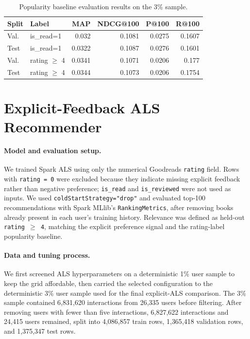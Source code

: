 \documentclass[10pt,twocolumn]{article}
\begin{document}
\begin{table}[!ht]
\centering
\caption{Popularity baseline evaluation results on the 3\% sample.}
\label{tab:popularity}
\footnotesize
\setlength{\tabcolsep}{3pt}
\begin{tabular}{l l r r r r}
\toprule
\textbf{Split} & \textbf{Label} & \textbf{MAP} & \textbf{NDCG@100} & \textbf{P@100} & \textbf{R@100} \\
\midrule
Val.  & is\_read=1     & 0.032 & 0.1081 & 0.0275 & 0.1607 \\
Test  & is\_read=1     & 0.0322 & 0.1087 & 0.0276 & 0.1601 \\
Val.  & rating $\geq$ 4 & 0.0341 & 0.1071 & 0.0206 & 0.177 \\
Test  & rating $\geq$ 4 & 0.0344 & 0.1073 & 0.0206 & 0.1754 \\
\bottomrule
\end{tabular}
\end{table}

\section{Explicit-Feedback ALS Recommender}

\paragraph{Model and evaluation setup.} We trained Spark ALS using only the numerical Goodreads \texttt{rating} field. Rows with \texttt{rating = 0} were excluded because they indicate missing explicit feedback rather than negative preference; \texttt{is\_read} and \texttt{is\_reviewed} were not used as inputs. We used \texttt{coldStartStrategy="drop"} and evaluated top-100 recommendations with Spark MLlib's \texttt{RankingMetrics}, after removing books already present in each user's training history. Relevance was defined as held-out \texttt{rating $\geq$ 4}, matching the explicit preference signal and the rating-label popularity baseline.

\paragraph{Data and tuning process.} We first screened ALS hyperparameters on a deterministic 1\% user sample to keep the grid affordable, then carried the selected configuration to the deterministic 3\% user sample used for the final explicit-ALS comparison. The 3\% sample contained 6{,}831{,}620 interactions from 26{,}335 users before filtering. After removing users with fewer than five interactions, 6{,}827{,}622 interactions and 24{,}415 users remained, split into 4{,}086{,}857 train rows, 1{,}365{,}418 validation rows, and 1{,}375{,}347 test rows.
\end{document}
